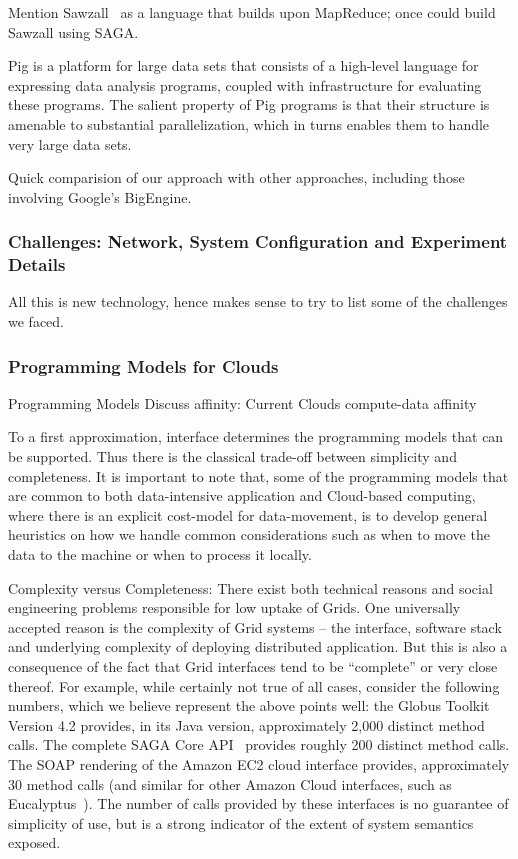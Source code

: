 \documentclass[conference,final]{IEEEtran}
\begin{document}
Mention Sawzall~\cite{sawzall} as a language that builds upon
MapReduce; once could build Sawzall using SAGA.

Pig is a platform for large data sets that consists of a high-level
language for expressing data analysis programs, coupled with
infrastructure for evaluating these programs. The salient property of
Pig programs is that their structure is amenable to substantial
parallelization, which in turns enables them to handle very large data
sets.

Quick comparision of our approach with other approaches, including
those involving Google's BigEngine.


\subsubsection*{Challenges: Network, System Configuration and
  Experiment Details}

All this is new technology, hence makes sense to try to list some of
the challenges we faced.

\subsubsection*{Programming Models for Clouds}
Programming Models Discuss affinity: Current Clouds compute-data
affinity


To a first approximation, interface determines the programming models
that can be supported. Thus there is the classical trade-off between
simplicity and completeness.  It is important to note that, some of
the programming models that are common to both data-intensive
application and Cloud-based computing, where there is an explicit
cost-model for data-movement, is to develop general heuristics on how
we handle common considerations such as when to move the data to the
machine or when to process it locally.

Complexity versus Completeness: There exist both technical reasons and
social engineering problems responsible for low uptake of Grids. One
universally accepted reason is the complexity of Grid systems -- the
interface, software stack and underlying complexity of deploying
distributed application. But this is also a consequence of the fact
that Grid interfaces tend to be ``complete'' or very close thereof.
For example, while certainly not true of all cases, consider the
following numbers, which we believe represent the above points well:
the Globus Toolkit Version 4.2 provides, in its Java version,
approximately 2,000 distinct method calls.  The complete SAGA Core
API~\cite{saga_gfd90} provides roughly 200 distinct method calls.  The
SOAP rendering of the Amazon EC2 cloud interface provides,
approximately 30 method calls (and similar for other Amazon Cloud
interfaces, such as Eucalyptus~\cite{eucalyptus_url}).  The number of
calls provided by these interfaces is no guarantee of simplicity of
use, but is a strong indicator of the extent of system semantics
exposed.
\end{document}
